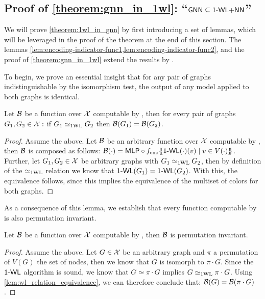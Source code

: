 \subsection{Proof of \cref*{theorem:gnn_in_1wl}: ``$\textsf{GNN} \subseteq \text{\textsf{1-WL+NN}}$''}\label{sec:proof_theorem:1wl_in_gnn}
We will prove \cref{theorem:1wl_in_gnn} by first introducing a set of lemmas, which will be leveraged in the proof of the theorem at the end of this section. The lemmas \cref{lem:encoding-indicator-func1,lem:encoding-indicator-func2}, and the proof of \cref{theorem:gnn_in_1wl} extend the results by \cite{Chen2019}.

To begin, we prove an essential insight that for any pair of graphs indistinguishable by the \wl isomorphism test, the output of any \wlnn model applied to both graphs is identical.
\begin{lemma}\label{lem:wl_relation_equivalence}
    Let $\mathcal{B}$ be a function over $\mathcal{X}$ computable by \wlnn, then for every pair of graphs $G_1, G_2 \in \mathcal{X}:$ if $G_1 \simeq_{\text{1WL}} G_2$ then $\mathcal{B}(G_1) = \mathcal{B}(G_2)$.
\end{lemma}
\begin{proof}
    Assume the above. Let $\mathcal{B}$ be an arbitrary function over $\mathcal{X}$ computable by \wlnn, then $\mathcal{B}$ is composed as follows: $\mathcal{B}(\cdot) = \textsf{MLP} \circ f_{\text{enc}} \{\!\!\{ \textsf{1-WL}(\cdot)(v) \mid v \in V(\cdot) \}\!\!\}$. Further, let $G_1, G_2 \in \mathcal{X}$ be arbitrary graphs with $G_1 \simeq_{\text{1WL}} G_2$, then by definition of the $\simeq_{\text{1WL}}$ relation we know that $\textsf{1-WL}(G_1) = \textsf{1-WL}(G_2)$. With this, the equivalence follows, since this implies the equivalence of the multiset of colors for both graphs.
\end{proof}

As a consequence of this lemma, we establish that every function computable by \wlnn is also permutation invariant.
\begin{corollary}\label{lem:wlnn_permutation_invariance}
    Let $\mathcal{B}$ be a function over $\mathcal{X}$ computable by \wlnn, then $\mathcal{B}$ is permutation invariant.
\end{corollary}

\begin{proof}
    Assume the above. Let $G \in \mathcal{X}$ be an arbitrary graph and $\pi$ a permutation of $V(G)$ the set of nodes, then we know that $G$ is isomorph to $\pi \cdot G$. Since the $\textsf{1-WL}$ algorithm is sound, we know that $G \simeq \pi \cdot G$ implies $G \simeq_{\text{1WL}} \pi \cdot G$. Using \cref{lem:wl_relation_equivalence}, we can therefore conclude that: $\mathcal{B}(G) = \mathcal{B}(\pi \cdot G)$.
\end{proof}

